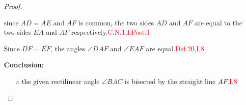 \clearpage

\begin{proof}

\begin{lemma}
since $AD = AE$ and $AF$ is common, the two sides $AD$ and $AF$ are equal to the two sides $EA$ and $AF$ respectively.\hfill \textcolor{red}{C.N.1,I.Post.1}
\end{lemma}

\begin{lemma}
Since $\overline{DF} = \overline{EF}$, the angles $\angle{DAF}$ and $\angle{EAF}$ are equal.\hfill \textcolor{red}{Def.20,I.8}
\end{lemma}

\textbf{Conclusion:} 

\begin{itemize}

\item[$\therefore$] the given rectilinear angle $\angle BAC$ is bisected by the straight line $AF$.\hfill \textcolor{red}{I.8}

\end{itemize}

\end{proof}

\clearpage
